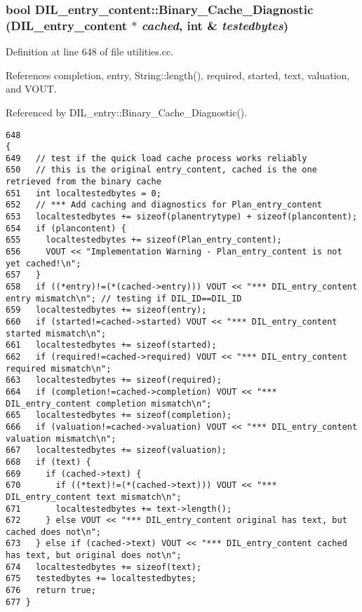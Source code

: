 \subsubsection{\setlength{\rightskip}{0pt plus 5cm}bool DIL\_\-entry\_\-content::Binary\_\-Cache\_\-Diagnostic (DIL\_\-entry\_\-content $\ast$ {\em cached}, int \& {\em testedbytes})}\label{classDIL__entry__content_a6}




Definition at line 648 of file utilities.cc.

References completion, entry, String::length(), required, started, text, valuation, and VOUT.

Referenced by DIL\_\-entry::Binary\_\-Cache\_\-Diagnostic().



\footnotesize\begin{verbatim}648                                                                                             {
649   // test if the quick load cache process works reliably
650   // this is the original entry_content, cached is the one retrieved from the binary cache
651   int localtestedbytes = 0;
652   // *** Add caching and diagnostics for Plan_entry_content
653   localtestedbytes += sizeof(planentrytype) + sizeof(plancontent);
654   if (plancontent) {
655     localtestedbytes += sizeof(Plan_entry_content);
656     VOUT << "Implementation Warning - Plan_entry_content is not yet cached!\n";
657   }
658   if ((*entry)!=(*(cached->entry))) VOUT << "*** DIL_entry_content entry mismatch\n"; // testing if DIL_ID==DIL_ID
659   localtestedbytes += sizeof(entry);
660   if (started!=cached->started) VOUT << "*** DIL_entry_content started mismatch\n";
661   localtestedbytes += sizeof(started);
662   if (required!=cached->required) VOUT << "*** DIL_entry_content required mismatch\n";
663   localtestedbytes += sizeof(required);
664   if (completion!=cached->completion) VOUT << "*** DIL_entry_content completion mismatch\n";
665   localtestedbytes += sizeof(completion);
666   if (valuation!=cached->valuation) VOUT << "*** DIL_entry_content valuation mismatch\n";
667   localtestedbytes += sizeof(valuation);
668   if (text) {
669     if (cached->text) {
670       if ((*text)!=(*(cached->text))) VOUT << "*** DIL_entry_content text mismatch\n";
671       localtestedbytes += text->length();
672     } else VOUT << "*** DIL_entry_content original has text, but cached does not\n";
673   } else if (cached->text) VOUT << "*** DIL_entry_content cached has text, but original does not\n";
674   localtestedbytes += sizeof(text);
675   testedbytes += localtestedbytes;
676   return true;
677 }
\end{verbatim}\normalsize 
{}
